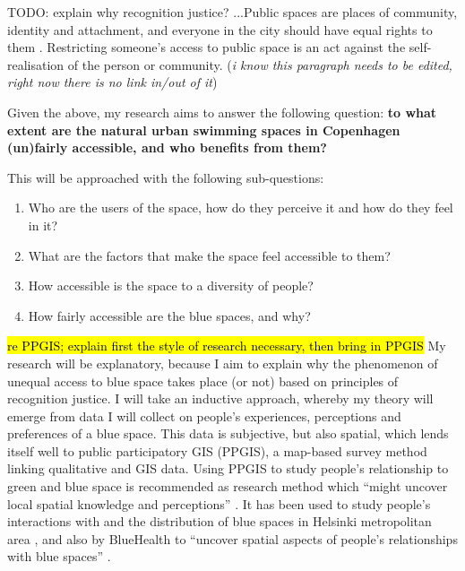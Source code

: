 \documentclass{article}
\begin{document}
TODO: explain why recognition justice?
...Public spaces are places of community, identity and attachment, and everyone in the city should have equal rights to them \parencite{agyeman2016trends}. Restricting someone's access to public space is an act against the self-realisation of the person or community. (\textit{i know this paragraph needs to be edited, right now there is no link in/out of it})

Given the above, my research aims to answer the following question: \textbf{to what extent are the natural urban swimming spaces in Copenhagen (un)fairly accessible, and who benefits from them?} %

This will be approached with the following sub-questions:

\begin{enumerate}
	\item Who are the users of the space, how do they perceive it and how do they feel in it?
	\item What are the factors that make the space feel accessible to them?
	\item How accessible is the space to a diversity of people? %
	\item How fairly accessible are the blue spaces, and why?
\end{enumerate}

\hl{re PPGIS; explain first the style of research necessary, then bring in PPGIS}
My research will be explanatory, because I aim to explain why the phenomenon of unequal access to blue space takes place (or not) based on principles of recognition justice.
I will take an inductive approach, whereby my theory will emerge from data I will collect on people's experiences, perceptions and preferences of a blue space.
This data is subjective, but also spatial, which lends itself well to public participatory GIS (PPGIS), a map-based survey method linking qualitative and GIS data.
Using PPGIS to study people's relationship to green and blue space is recommended as research method which ``might uncover local spatial knowledge and perceptions'' \parencite{anguelovski2020expanding}. It has been used to study people's interactions with and the distribution of blue spaces in Helsinki metropolitan area \parencite{raymond2016integrating}, and also by BlueHealth to ``uncover spatial aspects of people’s relationships with blue spaces'' \parencite{bluehealthsoftgis}.
\end{document}
